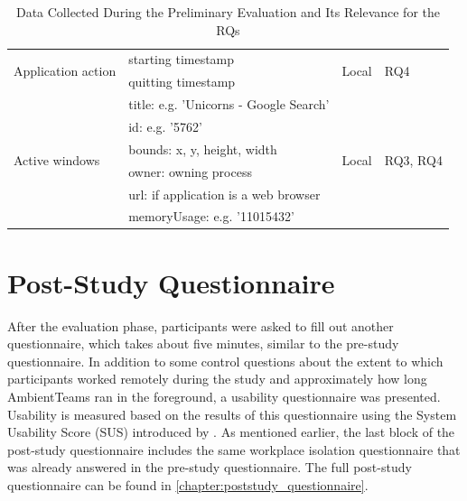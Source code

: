 \begin{table}[h]
\begin{tabularx}{.9\textwidth}{l X l l}
        \midrule
        \multirow{2}{*}{Application action}  & starting timestamp                     & \multirow{2}{*}{Local}  & \multirow{2}{*}{RQ4    }      \\
                                             & quitting timestamp                     &                         &                               \\


        \midrule
        \multirow{6}{*}{Active windows}      & title: e.g. 'Unicorns - Google Search' & \multirow{6}{*}{Local}  & \multirow{6}{*}{RQ3, RQ4}     \\
                                             & id: e.g. '5762'                        &                         &                               \\
                                             & bounds: x, y, height, width            &                         &                               \\
                                             & owner: owning process                  &                         &                               \\
                                             & url: if application is a web browser   &                         &                               \\
                                             & memoryUsage: e.g. '11015432'           &                         &                               \\
        \bottomrule
    \end{tabularx}
    \caption{Data Collected During the Preliminary Evaluation and Its Relevance for the RQs}
    \label{table:data}
\end{table}

\section{Post-Study Questionnaire}
\label{section:poststudy_questionnaire}
After the evaluation phase, participants were asked to fill out another questionnaire, which takes about five minutes, similar to the pre-study questionnaire. In addition to some control questions about the extent to which participants worked remotely during the study and approximately how long AmbientTeams ran in the foreground, a usability questionnaire was presented. Usability is measured based on the results of this questionnaire using the System Usability Score (SUS) introduced by \textcite{brooke1996sus}. As mentioned earlier, the last block of the post-study questionnaire includes the same workplace isolation questionnaire that was already answered in the pre-study questionnaire. The full post-study questionnaire can be found in \autoref{chapter:poststudy_questionnaire}.

